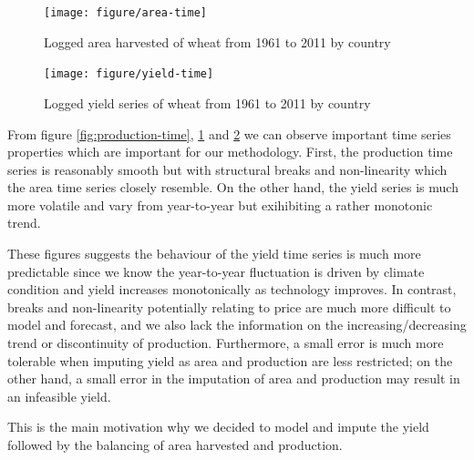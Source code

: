 \documentclass[nojss]{jss}\usepackage[]{graphicx}\usepackage[]{color}
\newenvironment{knitrout}{}{} %
\begin{document}
\begin{knitrout}
\color{fgcolor}\begin{figure}[!ht]


{\centering \texttt{[image: figure/area-time]} 

}

\caption[Logged area harvested of wheat from 1961 to 2011 by country]{Logged area harvested of wheat from 1961 to 2011 by country\label{fig:area-time}}
\end{figure}


\end{knitrout}


\begin{knitrout}
\color{fgcolor}\begin{figure}[!ht]


{\centering \texttt{[image: figure/yield-time]} 

}

\caption[Logged yield series of wheat from 1961 to 2011 by country]{Logged yield series of wheat from 1961 to 2011 by country\label{fig:yield-time}}
\end{figure}


\end{knitrout}


From figure \ref{fig:production-time}, \ref{fig:area-time} and
\ref{fig:yield-time} we can observe important time series properties
which are important for our methodology. First, the production time
series is reasonably smooth but with structural breaks and
non-linearity which the area time series closely resemble. On the
other hand, the yield series is much more volatile and vary from
year-to-year but exihibiting a rather monotonic trend.

These figures suggests the behaviour of the yield time series is much
more predictable since we know the year-to-year fluctuation is driven
by climate condition and yield increases monotonically as technology
improves. In contrast, breaks and non-linearity potentially relating
to price are much more difficult to model and forecast, and we also
lack the information on the increasing/decreasing trend or
discontinuity of production. Furthermore, a small error is much more
tolerable when imputing yield as area and production are less
restricted; on the other hand, a small error in the imputation of area
and production may result in an infeasible yield.

This is the main motivation why we decided to model and impute the
yield followed by the balancing of area harvested and production.
\end{document}
